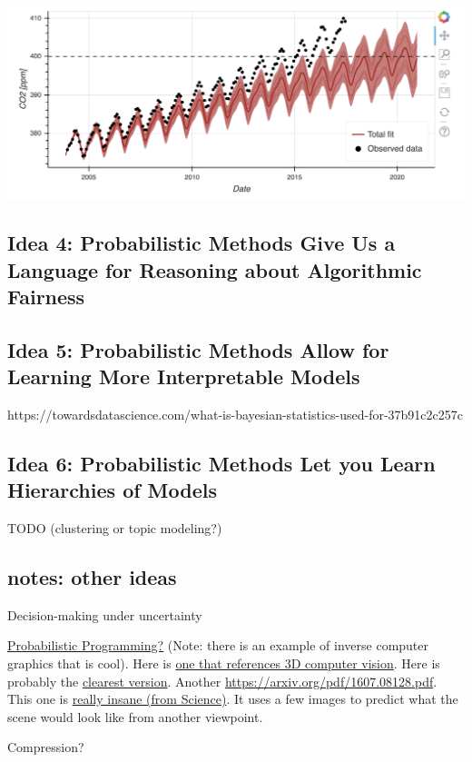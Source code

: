 \documentclass[assignment01_Solutions]{subfiles}
\begin{document}
\begin{center}
\includegraphics[width=0.8\linewidth]{figures/maunaloa}
\end{center}


\subsection*{Idea 4: Probabilistic Methods Give Us a Language for Reasoning about Algorithmic Fairness}


\subsection*{Idea 5: Probabilistic Methods Allow for Learning More Interpretable Models}

https://towardsdatascience.com/what-is-bayesian-statistics-used-for-37b91c2c257c

\subsection*{Idea 6: Probabilistic Methods Let you Learn Hierarchies of Models}
TODO (clustering or topic modeling?)


\subsection*{notes: other ideas}
\bi
\item Decision-making under uncertainty
\item \href{https://arxiv.org/pdf/1809.10756.pdf}{Probabilistic Programming?} (Note: there is an example of inverse computer graphics that is cool).  Here is \href{https://www.youtube.com/watch?v=DImI6l_0yiM}{one that references 3D computer vision}.  Here is probably the \href{http://mrkulk.github.io/www_cvpr15/}{clearest version}.  Another \href{cool example}{https://arxiv.org/pdf/1607.08128.pdf}.  This one is \href{https://science.sciencemag.org/content/sci/360/6394/1204.full.pdf}{really insane (from Science)}.   It uses a few images to predict what the scene would look like from another viewpoint.
\item Compression?
\ei
\end{document}
